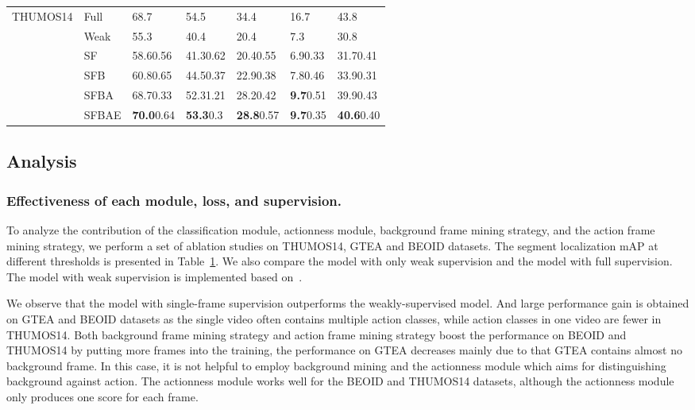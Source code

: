 \documentclass[runningheads]{llncs}
\begin{document}
\begin{table}[!ht]
\begin{tabular}{c|l|p{1.7cm}p{1.7cm}p{1.7cm}p{1.7cm}p{1.7cm}}
			
			\multirow{6}{*}{THUMOS14} 
			
			&Full & 68.7 & 54.5 & 34.4 & 16.7 & 43.8 \\ 
			&Weak & 55.3 & 40.4 & 20.4 & 7.3 & 30.8 \\ \cline{2-7}
			&SF & 58.60.56 & 41.30.62 & 20.40.55 & 6.90.33 & 31.70.41 \\ 
			&SFB & 60.80.65 & 44.50.37 & 22.90.38 & 7.80.46 & 33.90.31 \\ 
			&SFBA & 68.70.33 & 52.31.21 & 28.20.42 & \textbf{9.7}0.51 & 39.90.43 \\ 
			&SFBAE & \textbf{70.0}0.64 & \textbf{53.3}0.3 & \textbf{28.8}0.57 & \textbf{9.7}0.35 & \textbf{40.6}0.40 \\ \hline
			
			
			
		\end{tabular}
\label{tab:ab}
	\end{table}
	
	
	
	\subsection{Analysis}
	
	\subsubsection{Effectiveness of each module, loss, and supervision.}
	
	To analyze the contribution of the classification module, actionness module, background frame mining strategy, and the action frame mining strategy, we perform a set of ablation studies on THUMOS14, GTEA and BEOID datasets. The segment localization mAP at different thresholds is presented in Table~\ref{tab:ab}. We also compare the model with only weak supervision and the model with full supervision. The model with weak supervision is implemented based on~\cite{Narayan_2019_ICCV}.
	
	We observe that the model with single-frame supervision outperforms the weakly-supervised model. And large performance gain is obtained on GTEA and BEOID datasets as the single video often contains multiple action classes, while action classes in one video are fewer in THUMOS14. Both background frame mining strategy and action frame mining strategy boost the performance on BEOID and THUMOS14 by putting more frames into the training, the performance on GTEA decreases mainly due to that GTEA contains almost no background frame. In this case, it is not helpful to employ background mining and the actionness module which aims for distinguishing background against action. The actionness module works well for the BEOID and THUMOS14 datasets, although the actionness module only produces one score for each frame.
	
\end{document}
